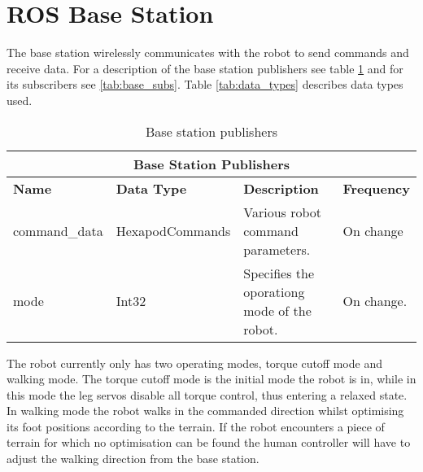 \newpage
\section{ROS Base Station} \label{sec:base_ros}
    The base station wirelessly communicates with the robot to send commands and receive data.
    For a description of the base station publishers see table \ref{tab:base_pubs} and for its subscribers see \ref{tab:base_subs}. Table \ref{tab:data_types} describes
    data types used.
    \begin{table}[h]
        \centering
        \begin{tabularx}{\textwidth}{| l | l | X | l |}
            \hline
            \multicolumn{4}{|c|}{\textbf{Base Station Publishers}} \\ \hline
            \textbf{Name} & \textbf{Data Type} & \textbf{Description} & \textbf{Frequency} \\ \hline
            command\_data & HexapodCommands & Various robot command parameters. & On change \\ \hline
            mode & Int32 & Specifies the oporationg mode of the robot. & On change. \\ \hline
        \end{tabularx}
        \caption{Base station publishers}
        \label{tab:base_pubs}
    \end{table}
    
    \noindent
    The robot currently only has two operating modes, torque cutoff mode and walking mode. The torque cutoff mode is the initial mode the robot is in,
    while in this mode the leg servos disable all torque control, thus entering a relaxed state. In walking mode the robot walks in the commanded direction
    whilst optimising its foot positions according to the terrain. If the robot encounters a piece of terrain for which no optimisation can be found the
    human controller will have to adjust the walking direction from the base station.

